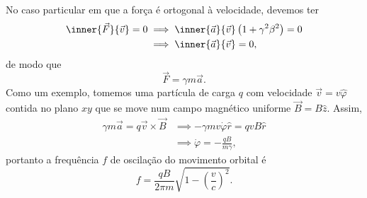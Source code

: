 No caso particular em que a força é ortogonal à velocidade, devemos ter
\begin{align*}
    \inner{\vec{F}}{\vec{v}} = 0 &\implies \inner{\vec{a}}{\vec{v}}\left(1 + \gamma^2 \beta^2\right) = 0\\
                                 &\implies \inner{\vec{a}}{\vec{v}} = 0,
\end{align*}
de modo que
\begin{equation*}
    \vec{F} = \gamma m\vec{a}.
\end{equation*}
Como um exemplo, tomemos uma partícula de carga \(q\) com velocidade \(\vec{v} = v \hat{\varphi}\) contida no plano \(xy\) que se move num campo magnético uniforme \(\vec{B} = B \hat{z}\). Assim,
\begin{align*}
    \gamma m\vec{a} = q \vec{v} \times \vec{B} &\implies -\gamma m v \dot\varphi \hat{r} = qvB \hat{r}\\
                                               &\implies \dot\varphi = -\frac{qB}{m \gamma},
\end{align*}
portanto a frequência \(f\) de oscilação do movimento orbital é
\begin{equation*}
    f = \frac{qB}{2\pi m}\sqrt{1 - \left(\frac{v}{c}\right)^2}.
\end{equation*}
